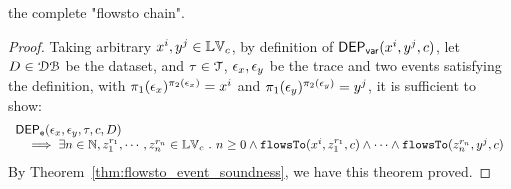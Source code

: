  the complete "flowsto chain".
%
\begin{proof}
  Taking arbitrary $x^i, y^j \in \mathbb{LV}_c$,
%
%
by definition of $\mathsf{DEP_{var}}(x^i, y^j, {c})$, 
let $D \in \mathcal{DB}$ be the dataset,
and $\mathtt{\tau} \in \mathcal{T}$, $\mathtt{\epsilon}_x, \mathtt{\epsilon}_y$ be the trace and two events satisfying the definition, 
with $\pi_1(\mathtt{\epsilon}_x)^{\pi_2(\mathtt{\epsilon}_x)} = x^i$ and $\pi_1(\mathtt{\epsilon}_y)^{\pi_2(\mathtt{\epsilon}_y)} = y^j$,  it is sufficient to show:
$$
\begin{array}{l}
  \mathsf{DEP_{\mathtt{e}}}(\mathtt{\epsilon}_x, \mathtt{\epsilon}_y, \mathtt{\tau}, c, D) 
  \\ \quad 
  \implies 
  \exists n \in \mathbb{N}, z_1^{r_1}, \cdots, z_n^{r_n} \in \mathbb{LV}_{{c}} ~.~ n \geq 0 \land
  \mathtt{flowsTo}(x^i,  z_1^{r_1}, c) 
  \land \cdots \land \mathtt{flowsTo}(z_n^{r_n}, y^j, c) 
\end{array}
$$
%
By Theorem~\ref{thm:flowsto_event_soundness}, we have this theorem proved.
\end{proof}